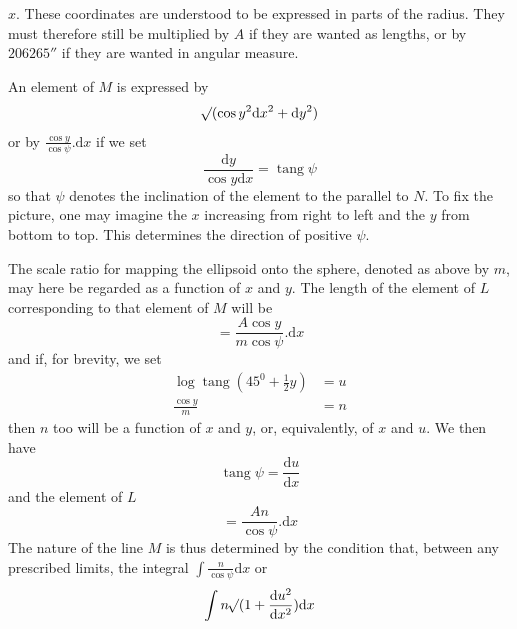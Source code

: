 %
\(x\). These coordinates are understood to be expressed in parts of the radius. They must therefore still be multiplied by \(A\) if they are wanted as lengths, or by \(206265''\) if they are wanted in angular measure.

An element of \(M\) is expressed by
\[
\mathord{{}^{}\!\surd}(\cos y^2\mathrm{d}x^2+\mathrm{d}y^2)
\]
or by \(\frac{\cos y}{\cos\psi}\mathord{.}\mathrm{d}x\) if we set
\[
\frac{\mathrm{d}y}{\cos y\mathrm{d}x}=\operatorname{tang}\psi
\]
so that \(\psi\) denotes the inclination of the element to the parallel to \(N\). To fix the picture, one may imagine the \(x\) increasing from right to left and the \(y\) from bottom to top. This determines the direction of positive \(\psi\).

The scale ratio for mapping the ellipsoid onto the sphere, denoted as above by \(m\), may here be regarded as a function of \(x\) and \(y\). The length of the element of \(L\) corresponding to that element of \(M\) will be
\[
=\frac{A\cos y}{m\cos\psi}\mathord{.}\mathrm{d}x
\]
and if, for brevity, we set
\[
\begin{aligned}
\log\operatorname{tang}(45^0+\tfrac{1}{2}y)&=u\\
\frac{\cos y}{m}&=n
\end{aligned}
\]
then \(n\) too will be a function of \(x\) and \(y\), or, equivalently, of \(x\) and \(u\). We then have
\[
\operatorname{tang}\psi=\frac{\mathrm{d}u}{\mathrm{d}x}
\]
and the element of \(L\)
\[
=\frac{An}{\cos\psi}\mathord{.}\mathrm{d}x
\]
\indent The nature of the line \(M\) is thus determined by the condition that, between any prescribed limits, the integral \(\int\frac{n}{\cos\psi}\mathrm{d}x\) or
\[
\int n\mathord{{}^{}\!\surd}(1+\frac{\mathrm{d}u^2}{\mathrm{d}x^2})\mathrm{d}x
\]
